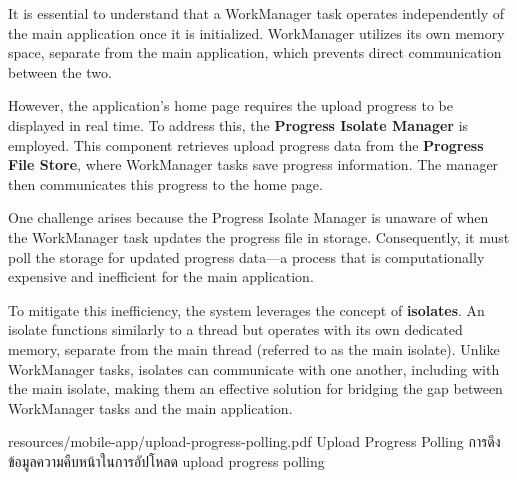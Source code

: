 It is essential to understand that a WorkManager task operates independently of the main application once it is initialized. WorkManager utilizes its own memory space, separate from the main application, which prevents direct communication between the two.

However, the application's home page requires the upload progress to be displayed in real time. To address this, the \textbf{Progress Isolate Manager} is employed. This component retrieves upload progress data from the \textbf{Progress File Store}, where WorkManager tasks save progress information. The manager then communicates this progress to the home page.

One challenge arises because the Progress Isolate Manager is unaware of when the WorkManager task updates the progress file in storage. Consequently, it must poll the storage for updated progress data—a process that is computationally expensive and inefficient for the main application.

To mitigate this inefficiency, the system leverages the concept of \textbf{isolates}. An isolate functions similarly to a thread but operates with its own dedicated memory, separate from the main thread (referred to as the main isolate). Unlike WorkManager tasks, isolates can communicate with one another, including with the main isolate, making them an effective solution for bridging the gap between WorkManager tasks and the main application.


\insertPDFfigure
{resources/mobile-app/upload-progress-polling.pdf}
{\ifenglish Upload Progress Polling \else การดึงข้อมูลความคืบหน้าในการอัปโหลด \fi}
{upload progress polling}

